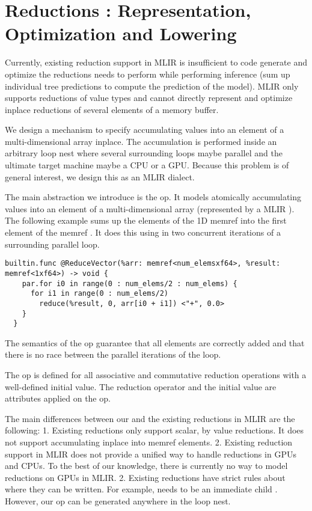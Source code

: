 \section{Reductions : Representation, Optimization and Lowering}
\label{sec:reduction}
Currently, existing reduction support in MLIR is insufficient 
to code generate and optimize the reductions \Treebeard{} needs
to perform while performing inference (sum up individual 
tree predictions to compute the prediction of the model). 
MLIR only supports reductions of value types and cannot 
directly represent and optimize inplace reductions of 
several elements of a memory buffer. 

We design a mechanism to specify accumulating values into
an element of a multi-dimensional array inplace. 
The accumulation is performed inside an arbitrary 
loop nest where several surrounding loops maybe parallel and 
the ultimate target machine maybe a CPU or a GPU. Because this problem 
is of general interest, we design this as an MLIR dialect. 

The main abstraction we introduce is the  op. It models 
atomically accumulating values into an element of a 
multi-dimensional array (represented by a MLIR ).
The following example sums up the elements of the 1D memref 
into the first element of the memref . It does this
using in two concurrent iterations of a surrounding 
parallel loop.

\begin{lstlisting}[style=c++]
  builtin.func @ReduceVector(%arr: memref<num_elemsxf64>, %result: memref<1xf64>) -> void {
    par.for i0 in range(0 : num_elems/2 : num_elems) {
      for i1 in range(0 : num_elems/2) 
        reduce(%result, 0, arr[i0 + i1]) <"+", 0.0>
    }
  }
\end{lstlisting}

The semantics of the  op guarantee that all elements are 
correctly added and that there is no race between the parallel 
iterations of the loop.

The  op is defined for all associative and commutative
reduction operations with a well-defined initial value. The 
reduction operator and the initial value are attributes applied
on the  op. 

The main differences between our  and the existing 
reductions in MLIR are the following:
1. Existing reductions only support scalar, by value reductions. 
It does not support accumulating inplace into memref elements.
2. Existing reduction support in MLIR does not provide a unified
way to handle reductions in GPUs and CPUs. To the best of our 
knowledge, there is currently no way to model reductions on GPUs
in MLIR.
2. Existing reductions have strict rules about where they can be 
written. For example,  needs to be an immediate 
child . However, our  op can be
generated anywhere in the loop nest. 

